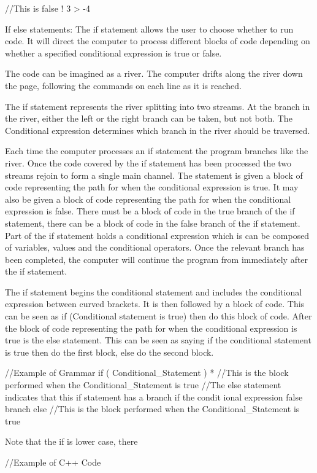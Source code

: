 \begin{DoxyItemize}
\begin{DoxyCode}
 //This is false
 ! 3 > -4
\end{DoxyCode}
 If else statements: The if statement allows the user to choose whether to run code. It will direct the computer to process different blocks of code depending on whether a specified conditional expression is true or false. \par
 The code can be imagined as a river. The computer drifts along the river down the page, following the commands on each line as it is reached. \par
 The if statement represents the river splitting into two streams. At the branch in the river, either the left or the right branch can be taken, but not both. The Conditional expression determines which branch in the river should be traversed. \par
 Each time the computer processes an if statement the program branches like the river. Once the code covered by the if statement has been processed the two streams rejoin to form a single main channel. The statement is given a block of code representing the path for when the conditional expression is true. It may also be given a block of code representing the path for when the conditional expression is false. There must be a block of code in the true branch of the if statement, there can be a block of code in the false branch of the if statement. Part of the if statement holds a conditional expression which is can be composed of variables, values and the conditional operators. Once the relevant branch has been completed, the computer will continue the program from immediately after the if statement. \par
 The if statement begins the conditional statement and includes the conditional expression between curved brackets. It is then followed by a block of code. This can be seen as if (Conditional statement is true) then do this block of code. After the block of code representing the path for when the conditional expression is true is the else statement. This can be seen as saying if the conditional statement is true then do the first block, else do the second block. 
\begin{DoxyCode}
 //Example of Grammar
 if ( Conditional_Statement )
 * //This is the block performed when the Conditional_Statement is true
 {  }
 //The else statement indicates that this if statement has a branch if the condit
      ional expression false branch
 else
  //This is the block performed when the Conditional_Statement is true
 {  }
\end{DoxyCode}
 Note that the if is lower case, there 
\begin{DoxyCode}
 //Example of C++ Code


\end{DoxyCode}
\end{DoxyItemize}
